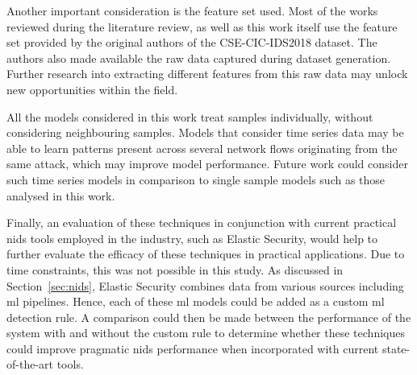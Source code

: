 Another important consideration is the feature set used. Most of the works
reviewed during the literature review, as well as this work itself use the
feature set provided by the original authors of the CSE-CIC-IDS2018 dataset.
The authors also made available the raw data captured during dataset
generation. Further research into extracting different features from this raw
data may unlock new opportunities within the field.

All the models considered in this work treat samples individually, without
considering neighbouring samples. Models that consider time series data may be
able to learn patterns present across several network flows originating from
the same attack, which may improve model performance. Future work could
consider such time series models in comparison to single sample models such as
those analysed in this work.

Finally, an evaluation of these techniques in conjunction with current
practical \gls{nids} tools employed in the industry, such as Elastic Security,
would help to further evaluate the efficacy of these techniques in practical
applications. Due to time constraints, this was not possible in this study. As
discussed in Section~\ref{sec:nids}, Elastic Security combines data from
various sources including \gls{ml} pipelines. Hence, each of these \gls{ml} models
could be added as a custom \gls{ml} detection rule. A comparison could then be
made between the performance of the system with and without the custom rule to
determine whether these techniques could improve pragmatic \gls{nids}
performance when incorporated with current state-of-the-art tools.